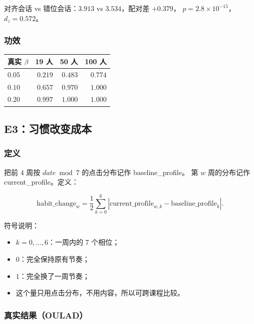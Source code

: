 \documentclass[UTF8,a4paper,11pt]{ctexart}
\begin{document}
对齐会话 vs 错位会话：$3.913$ vs $3.534$，配对差 $+0.379$，
$p=2.8\times10^{-15}$，$d_z=0.572$。

\subsubsection{功效}

\begin{center}
\begin{longtable}{@{}lrrr@{}}
\toprule
\textbf{真实 $\beta$} & \textbf{19 人} & \textbf{50 人} & \textbf{100 人} \\
\midrule
$0.05$ & $0.219$ & $0.483$ & $0.774$ \\
$0.10$ & $0.657$ & $0.970$ & $1.000$ \\
$0.20$ & $0.997$ & $1.000$ & $1.000$ \\
\bottomrule
\end{longtable}
\end{center}

\subsection{E3：习惯改变成本}

\subsubsection{定义}

把前 4 周按 $date\bmod 7$ 的点击分布记作 baseline\_profile。
第 $w$ 周的分布记作 current\_profile。定义：

\begin{equation}
\text{habit\_change}_w
=
\frac12\sum_{k=0}^{6}
\left|
\mathrm{current\_profile}_{w,k}
-
\mathrm{baseline\_profile}_{k}
\right|.
\end{equation}

符号说明：

\begin{itemize}[leftmargin=2em]
\item $k=0,\ldots,6$：一周内的 7 个相位；
\item $0$：完全保持原有节奏；
\item $1$：完全换了一周节奏；
\item 这个量只用点击分布，不用内容，所以可跨课程比较。
\end{itemize}

\subsubsection{真实结果（OULAD）}
\end{document}
